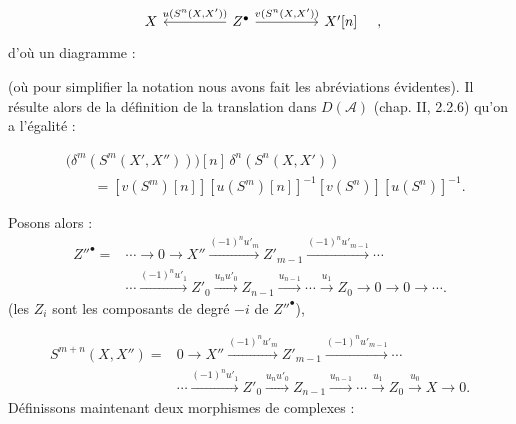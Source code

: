 \clearpage
{}%
\begingroup\small\setlength{\parskip}{0pt}\setlength{\emergencystretch}{1.5em}
\setlength{\abovedisplayskip}{4pt plus 2pt minus 2pt}%
\setlength{\belowdisplayskip}{4pt plus 2pt minus 2pt}%

\[
\begin{tikzcd}[column sep=4.5em]
X & Z^\bullet
  \arrow[l,"{u(S^n(X,X'))}"']
  \arrow[r,"{v(S^n(X,X'))}"]
& X'[n]
\end{tikzcd}
\quad,
\]
d'où un diagramme :

\begin{center}
\end{center}
(où pour simplifier la notation nous avons fait les abréviations
évidentes). Il résulte alors de la définition de la translation dans
$D(\mathcal A)$ (chap. II, 2.2.6) qu'on a l'égalité :

\begin{equation}
\begin{aligned}
&\bigl(\delta^m(S^m(X',X''))\bigr)[n]\,
  \delta^n(S^n(X,X'))\\
&\qquad={}
[v(S^m)[n]][u(S^m)[n]]^{-1}[v(S^n)][u(S^n)]^{-1}.
\end{aligned}
\tag{3.2.5.1}
\end{equation}

Posons alors :
\begin{equation}
\begin{aligned}
Z''^\bullet={}&\cdots\longrightarrow0\longrightarrow X''
\xrightarrow{(-1)^n u'_m}Z'_{m-1}
\xrightarrow{(-1)^n u'_{m-1}}\cdots\\
&\cdots\xrightarrow{(-1)^n u'_1}Z'_0
\xrightarrow{u_nu'_0}Z_{n-1}
\xrightarrow{u_{n-1}}\cdots\xrightarrow{u_1}Z_0
\longrightarrow0\longrightarrow0\longrightarrow\cdots.
\end{aligned}
\tag{3.2.5.2}
\end{equation}
(les $Z_i$ sont les composants de degré $-i$ de $Z''^\bullet$),

\[
\begin{aligned}
S^{m+n}(X,X'')={}&0\longrightarrow X''
\xrightarrow{(-1)^n u'_m}Z'_{m-1}
\xrightarrow{(-1)^n u'_{m-1}}\cdots\\
&\cdots\xrightarrow{(-1)^n u'_1}Z'_0
\xrightarrow{u_nu'_0}Z_{n-1}
\xrightarrow{u_{n-1}}\cdots\xrightarrow{u_1}Z_0
\xrightarrow{u_0}X\longrightarrow0.
\end{aligned}
\]
Définissons maintenant deux morphismes de complexes :

